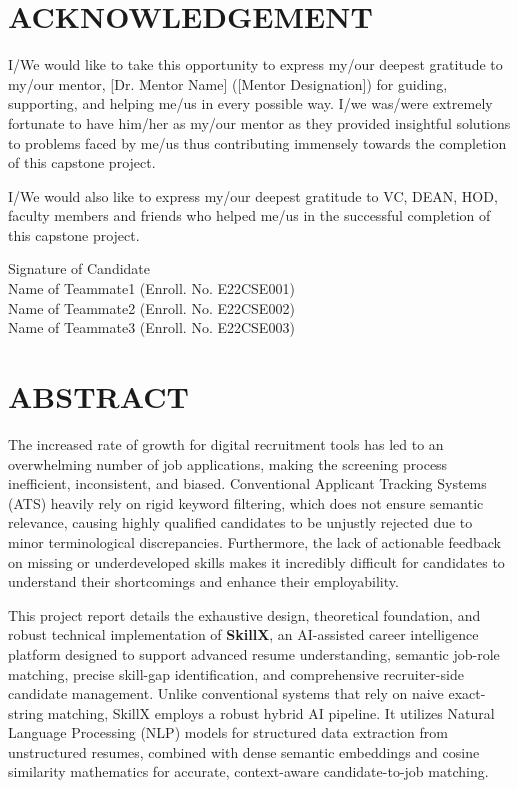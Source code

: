 \documentclass[12pt,a4paper]{report}
\begin{document}
\chapter*{ACKNOWLEDGEMENT}
I/We would like to take this opportunity to express my/our deepest gratitude to my/our mentor, [Dr. Mentor Name] ([Mentor Designation]) for guiding, supporting, and helping me/us in every possible way. I/we was/were extremely fortunate to have him/her as my/our mentor as they provided insightful solutions to problems faced by me/us thus contributing immensely towards the completion of this capstone project. 

I/We would also like to express my/our deepest gratitude to VC, DEAN, HOD, faculty members and friends who helped me/us in the successful completion of this capstone project.

\vspace{1in}
\noindent Signature of Candidate \\
Name of Teammate1 (Enroll. No. E22CSE001) \\
Name of Teammate2 (Enroll. No. E22CSE002) \\
Name of Teammate3 (Enroll. No. E22CSE003)

\chapter*{ABSTRACT}
The increased rate of growth for digital recruitment tools has led to an overwhelming number of job applications, making the screening process inefficient, inconsistent, and biased. Conventional Applicant Tracking Systems (ATS) heavily rely on rigid keyword filtering, which does not ensure semantic relevance, causing highly qualified candidates to be unjustly rejected due to minor terminological discrepancies. Furthermore, the lack of actionable feedback on missing or underdeveloped skills makes it incredibly difficult for candidates to understand their shortcomings and enhance their employability. 

This project report details the exhaustive design, theoretical foundation, and robust technical implementation of \textbf{SkillX}, an AI-assisted career intelligence platform designed to support advanced resume understanding, semantic job-role matching, precise skill-gap identification, and comprehensive recruiter-side candidate management. Unlike conventional systems that rely on naive exact-string matching, SkillX employs a robust hybrid AI pipeline. It utilizes Natural Language Processing (NLP) models for structured data extraction from unstructured resumes, combined with dense semantic embeddings and cosine similarity mathematics for accurate, context-aware candidate-to-job matching.
\end{document}
